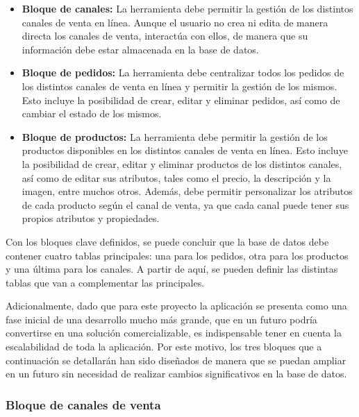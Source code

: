 \begin{itemize}
    \item \textbf{Bloque de canales:} La herramienta debe permitir la gestión de los distintos canales de venta en línea. Aunque el usuario no crea ni edita de manera directa los canales de venta, interactúa con ellos, de manera que su información debe estar almacenada en la base de datos.
    \item \textbf{Bloque de pedidos:} La herramienta debe centralizar todos los pedidos de los distintos canales de venta en línea y permitir la gestión de los mismos. Esto incluye la posibilidad de crear, editar y eliminar pedidos, así como de cambiar el estado de los mismos.
    \item \textbf{Bloque de productos:} La herramienta debe permitir la gestión de los productos disponibles en los distintos canales de venta en línea. Esto incluye la posibilidad de crear, editar y eliminar productos de los distintos canales, así como de editar sus atributos, tales como el precio, la descripción y la imagen, entre muchos otros. Además, debe permitir personalizar los atributos de cada producto según el canal de venta, ya que cada canal puede tener sus propios atributos y propiedades.
\end{itemize}

Con los bloques clave definidos, se puede concluir que la base de datos debe contener cuatro tablas principales: una para los pedidos, otra para los productos y una última para los canales. A partir de aquí, se pueden definir las distintas tablas que van a complementar las principales.

Adicionalmente, dado que para este proyecto la aplicación se presenta como una fase inicial de una desarrollo mucho más grande, que en un futuro podría convertirse en una solución comercializable, es indispensable tener en cuenta la escalabilidad de toda la aplicación. Por este motivo, los tres bloques que a continuación se detallarán han sido diseñados de manera que se puedan ampliar en un futuro sin necesidad de realizar cambios significativos en la base de datos.

\subsubsection{Bloque de canales de venta}

